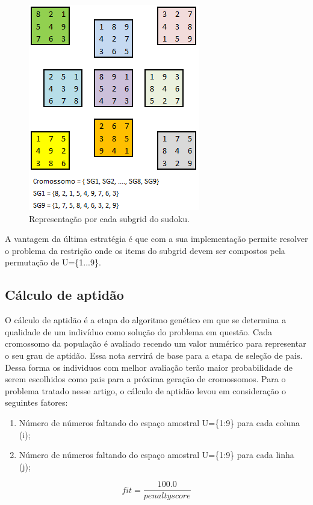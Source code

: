 \documentclass[twoside]{article}
\begin{document}
\begin{multicols}{2}
\begin{figure}[H]
  \caption{Representação por cada subgrid do sudoku.}
  \centering
    \includegraphics[scale = 0.8]{sudoku_subgrids.png}
\end{figure}

A vantagem da última estratégia é que com a sua implementação permite resolver o problema da restrição onde os items do subgrid devem ser compostos pela permutação de U=\{1...9\}.

\subsection{Cálculo de aptidão}
O cálculo de aptidão é a etapa do algoritmo genético em que se determina a qualidade de um indivíduo como solução do problema em questão. Cada cromossomo da população é avaliado recendo um valor numérico para representar o seu grau de aptidão. Essa nota servirá de base para a etapa de seleção de pais. Dessa forma os individuos com melhor avaliação terão maior probabilidade de serem escolhidos como pais para a próxima geração de cromossomos. Para o problema tratado nesse artigo, o cálculo de aptidão levou em consideração o seguintes fatores:
\begin{enumerate}
\item Número de números faltando do espaço amostral U=\{1:9\} para cada coluna (i);
\item Número de números faltando do espaço amostral U=\{1:9\} para cada linha (j);
\end{enumerate}

\begin{equation}
\label{eq:Função de avaliação}
\label{eq:fitness}
fit = \frac {100.0} {penaltyscore}
\end{equation}


\end{multicols}
\end{document}
